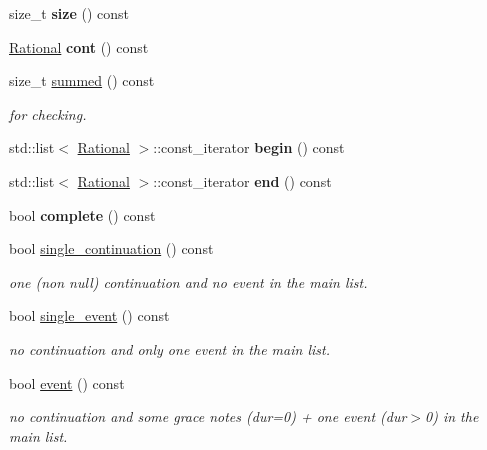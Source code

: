 \begin{DoxyCompactItemize}
size\+\_\+t {\bfseries size} () const
\item 
\mbox{\label{classDurationList_aa014f16c3c1300e781d6f3673b9b1152}} 
\mbox{\hyperlink{classRational}{Rational}} {\bfseries cont} () const
\item 
\mbox{\label{classDurationList_a61173a371c4d74d551f0915f132565c2}} 
size\+\_\+t \mbox{\hyperlink{classDurationList_a61173a371c4d74d551f0915f132565c2}{summed}} () const
\begin{DoxyCompactList}\small\item\em for checking. \end{DoxyCompactList}\item 
\mbox{\label{classDurationList_a7e2a43d04431026b96baf67ea0961df4}} 
std\+::list$<$ \mbox{\hyperlink{classRational}{Rational}} $>$\+::const\+\_\+iterator {\bfseries begin} () const
\item 
\mbox{\label{classDurationList_af72d4a22703809811bc5bc1ef9689220}} 
std\+::list$<$ \mbox{\hyperlink{classRational}{Rational}} $>$\+::const\+\_\+iterator {\bfseries end} () const
\item 
bool {\bfseries complete} () const
\item 
bool \mbox{\hyperlink{group__output_ga8b4434664a0dd2938fae9791fd34febd}{single\+\_\+continuation}} () const
\begin{DoxyCompactList}\small\item\em one (non null) continuation and no event in the main list. \end{DoxyCompactList}\item 
bool \mbox{\hyperlink{group__output_gabdd5f118e0ea1566362a9eaed2ce0471}{single\+\_\+event}} () const
\begin{DoxyCompactList}\small\item\em no continuation and only one event in the main list. \end{DoxyCompactList}\item 
bool \mbox{\hyperlink{group__output_gadd91aa5ec57a51c6253ea872eadb28dc}{event}} () const
\begin{DoxyCompactList}\small\item\em no continuation and some grace notes (dur=0) + one event (dur$>$0) in the main list. \end{DoxyCompactList}\item 

\end{DoxyCompactItemize}
